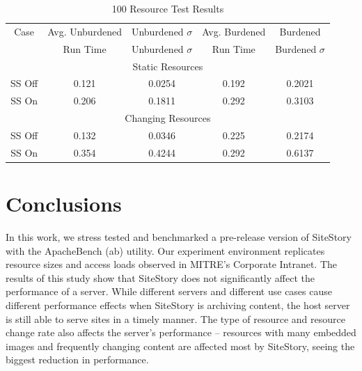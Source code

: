 \documentclass[runningheads,a4paper]{llncs}
\begin{document}
\begin{table}[h!]
\caption{100 Resource Test Results} %
\centering %
\begin{tabular}{c c c c c} %
\hline\hline %
Case & Avg. Unburdened & Unburdened $\sigma$ & Avg. Burdened & Burdened\\
     & Run Time & Unburdened $\sigma$ & Run Time  & Burdened $\sigma$\\ [0.5ex] %
\hline %
\multicolumn{5}{c}{Static Resources}\\
\hline %
SS Off & 0.121 & 0.0254 & 0.192 & 0.2021 \\
SS On & 0.206 & 0.1811 & 0.292 & 0.3103 \\
\hline \hline
\multicolumn{5}{c}{Changing Resources}\\
\hline %
SS Off & 0.132 & 0.0346 & 0.225 & 0.2174 \\
SS On & 0.354 & 0.4244 & 0.292 & 0.6137 \\
\hline %
\end{tabular}
\label{table100} %
\end{table}


\section{Conclusions}
\label{conclusion}
\vskip -3mm
In this work, we stress tested and benchmarked a pre-release version of SiteStory with the ApacheBench (ab) utility. Our experiment environment replicates resource sizes and access loads observed in  MITRE's Corporate Intranet. The results of this study show that SiteStory does not significantly affect the performance of a server. While different servers and different use cases cause different performance effects when SiteStory is archiving content, the host server is still able to serve sites in a timely manner. The type of resource and resource change rate also affects the server's performance -- resources with many embedded images and frequently changing content are affected most by SiteStory, seeing the biggest reduction in performance. 
\end{document}
